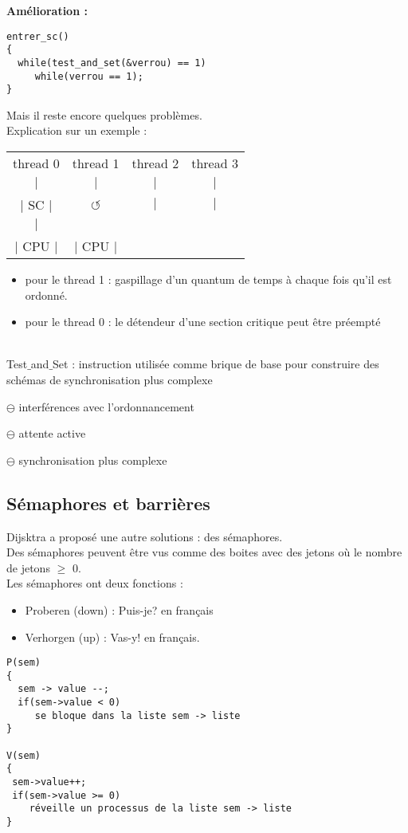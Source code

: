 \documentclass[12pt,a4paper]{report}
\begin{document}
\textbf{Amélioration :}
\smallskip
\begin{verbatim}
entrer_sc()
{
  while(test_and_set(&verrou) == 1)
     while(verrou == 1);
}
\end{verbatim}
\bigskip

Mais il reste encore quelques problèmes.\\
Explication sur un exemple :
\begin{center}
\begin{tabular}{c c c c}
thread 0 & thread 1 & thread 2 & thread 3 \\
$\mid$ & $\mid$ & $\mid$ & $\mid$ \\
$\mid$ SC $\mid$ & $\circlearrowleft$ & $\mid$ & $\mid$\\
$\mid$ & & & \\
$\mid$ CPU $\mid$ & $\mid$ CPU $\mid$ & & \\
\end{tabular}
\end{center}

\begin{itemize}
\item pour le thread 1 : gaspillage d'un quantum de temps à chaque fois qu'il est ordonné.
\item pour le thread 0 : le détendeur d'une section critique peut être préempté \\
\\
\end{itemize}

Test$\_$and$\_$Set : instruction utilisée comme brique de base pour construire des schémas de synchronisation plus complexe
\begin{description}
\item$\ominus$ interférences avec l'ordonnancement
\item$\ominus$ attente active
\item$\ominus$ synchronisation plus complexe\\
\end{description}

\subsection{Sémaphores et barrières}
Dijsktra a proposé une autre solutions : des sémaphores.\\
Des sémaphores peuvent être vus comme des boites avec des jetons où le nombre de jetons $\geq$ 0.\\

Les sémaphores ont deux fonctions :
\begin{itemize}
\item Proberen (down) : Puis-je? en français
\item Verhorgen (up) : Vas-y! en français.
\end{itemize}
\medskip
\begin{verbatim}
P(sem)
{
  sem -> value --;
  if(sem->value < 0)
     se bloque dans la liste sem -> liste
}

V(sem)
{
 sem->value++;
 if(sem->value >= 0)
    réveille un processus de la liste sem -> liste
}
\end{verbatim}
\end{document}
